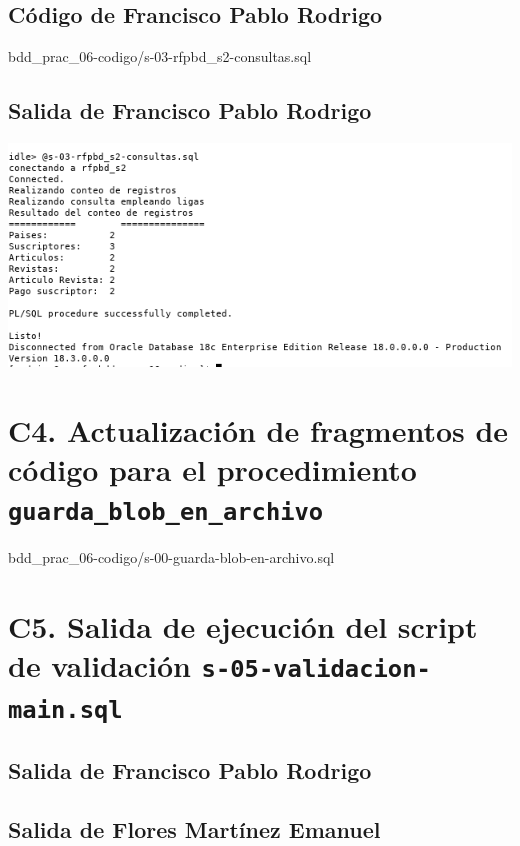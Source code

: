 \documentclass{article}
\newcommand{\codedir}{bdd_prac_06-codigo}
\begin{document}
\subsection*{Código de Francisco Pablo Rodrigo}

  {\codedir/s-03-rfpbd_s2-consultas.sql}

\subsection*{Salida de Francisco Pablo Rodrigo}
  \includegraphics[width=0.8\linewidth]{rfp_c3}

\section*{C4. Actualización de fragmentos de código para el procedimiento 
  \texttt{guarda\_blob\_en\_archivo}}

  
  {\codedir/s-00-guarda-blob-en-archivo.sql}

\section*{C5. Salida de ejecución del script de validación 
  \texttt{s-05-validacion-main.sql}}

  \subsection*{Salida de Francisco Pablo Rodrigo}

  

  \subsection*{Salida de Flores Martínez Emanuel}

  
\end{document}
